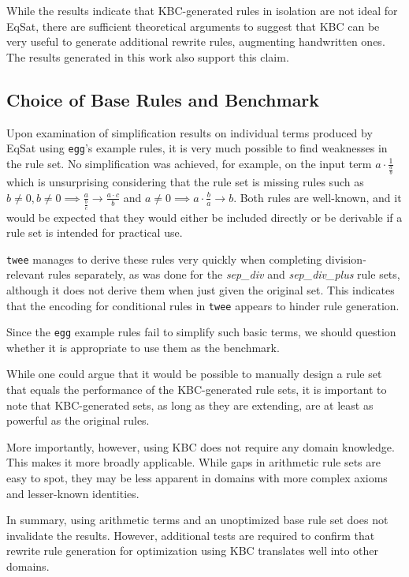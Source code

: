 While the results indicate that KBC-generated rules in isolation are not ideal for EqSat, there are sufficient theoretical arguments to suggest that KBC can be very useful to generate additional rewrite rules, augmenting handwritten ones. The results generated in this work also support this claim.

\subsection{Choice of Base Rules and Benchmark}
\label{sec:disuccion_base_rules}
Upon examination of simplification results on individual terms produced by EqSat using \texttt{egg}'s example rules, it is very much possible to find weaknesses in the rule set. No simplification was achieved, for example, on the input term $a \cdot \frac{1}{\frac{a}{b}}$ which is unsurprising considering that the rule set is missing rules such as $b \neq 0, b \neq 0 \implies \frac{a}{\frac{b}{c}} \to \frac{a \cdot c}{b}$ and $a \neq 0 \implies a \cdot \frac{b}{a} \to b$. Both rules are well-known, and it would be expected that they would either be included directly or be derivable if a rule set is intended for practical use.

\texttt{twee} manages to derive these rules very quickly when completing division-relevant rules separately, as was done for the \emph{sep\_div} and \emph{sep\_div\_plus} rule sets, although it does not derive them when just given the original set. This indicates that the encoding for conditional rules in \texttt{twee} appears to hinder rule generation.

Since the \texttt{egg} example rules fail to simplify such basic terms, we should question whether it is appropriate to use them as the benchmark. 

While one could argue that it would be possible to manually design a rule set that equals the performance of the KBC-generated rule sets, it is important to note that KBC-generated sets, as long as they are extending, are at least as powerful as the original rules.

More importantly, however, using KBC does not require any domain knowledge. This makes it more broadly applicable. While gaps in arithmetic rule sets are easy to spot, they may be less apparent in domains with more complex axioms and lesser-known identities.

In summary, using arithmetic terms and an unoptimized base rule set does not invalidate the results. However, additional tests are required to confirm that rewrite rule generation for optimization using KBC translates well into other domains. 

